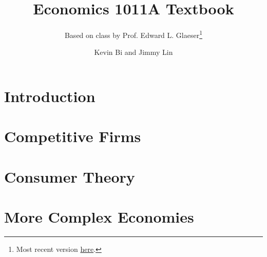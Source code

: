 \documentclass[12pt,twoside=false,openright,numbers=noenddot]{scrbook}
\title{Economics 1011A Textbook}
\subtitle{Based on class by Prof. Edward L. Glaeser\footnote{Most recent version \href{https://github.com/TheKeveloper/ECON-1011A-Textbook/blob/master/textbook.pdf}{here}.}}
\author{Kevin Bi and Jimmy Lin}
\begin{document}
\maketitle
\tableofcontents

\part{Introduction}




\part{Competitive Firms}



\part{Consumer Theory}





\part{More Complex Economies}



\end{document}
